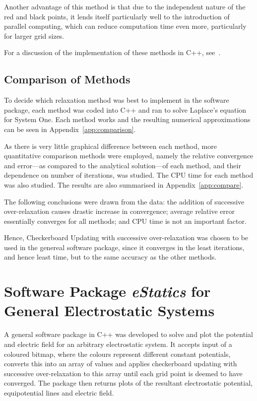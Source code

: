 \documentclass[11pt, a4paper]{article}
\begin{document}
Another advantage of this method is that due to the independent nature of the red and
black points, it lends itself particularly well to the introduction of parallel 
computing, which can reduce computation time even more, particularly for larger grid
sizes.

For a discussion of the implementation of these methods in C++, see~\cite{nr}.

\subsection{Comparison of Methods}

To decide which relaxation method was best to implement in the software package,
each method was coded into C++ and ran to solve Laplace's equation for System One.
Each method works and the resulting numerical approximations can be seen in
Appendix~\ref{app:comparison}.

As there is very little graphical difference between each method, more quantitative
comparison methods were employed, namely the relative convergence and error---as
compared to the analytical solution---of each method, and their dependence on number
of iterations, was studied. The CPU time for each method was also studied. The results
are also summarised in Appendix~\ref{app:compare}.

The following conclusions were drawn from the data: the addition of successive
over-relaxation causes drastic increase in convergence; average relative error
essentially converges for all methods; and CPU time is not an important factor.

Hence, Checkerboard Updating with successive over-relaxation was chosen to be used
in the genereal software package, since it converges in the least iterations,
and hence least time, but to the same accuracy as the other methods.

\section{Software Package \emph{eStatics} for General Electrostatic Systems}

A general software package in C++ was developed to solve and plot the potential and
electric field for an arbitrary electrostatic system. It accepts input of a coloured
bitmap, where the colours represent different constant potentials, converts this into
an array of values and applies checkerboard updating with successive over-relaxation
to this array until each grid point is deemed to have converged. The package then
returns plots of the resultant electrostatic potential, equipotential lines and electric
field.
\end{document}
